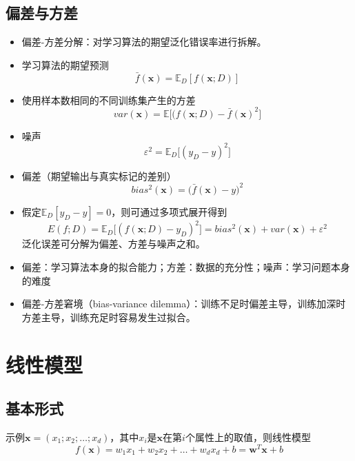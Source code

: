 \documentclass{ctexart}
\begin{document}
				\subsection{偏差与方差}
					\begin{itemize}
						\item 偏差-方差分解：对学习算法的期望泛化错误率进行拆解。
						\item 学习算法的期望预测\[\bar{f}(\bm{x})=\mathbb{E}_D[f(\bm{x};D)]\]
						\item 使用样本数相同的不同训练集产生的方差\[var(\bm{x})=\mathbb{E}\big[(f(\bm{x};D)-\bar{f}(\bm{x})^2\big]\]
						\item 噪声\[\varepsilon^2=\mathbb{E}_D\big[(y_D-y)^2\big]\]
						\item 偏差（期望输出与真实标记的差别）\[bias^2(\bm{x})=\big(\bar{f}(\bm{x})-y\big)^2\]
						\item 假定$\mathbb{E}_D[y_D-y]=0$，则可通过多项式展开得到\[E(f;D)=\mathbb{E}_D\big[(f(\bm{x};D)-y_D)^2\big]=bias^2(\bm{x})+var(\bm{x})+\varepsilon^2\]泛化误差可分解为偏差、方差与噪声之和。
						\item 偏差：学习算法本身的拟合能力；方差：数据的充分性；噪声：学习问题本身的难度
						\item 偏差-方差窘境（bias-variance dilemma）：训练不足时偏差主导，训练加深时方差主导，训练充足时容易发生过拟合。
					\end{itemize}
			\section{线性模型}
				\subsection{基本形式}
				
					示例$\bm{x}=(x_1;x_2;\dots;x_d)$，其中$x_i$是$\bm{x}$在第$i$个属性上的取值，则线性模型\[f(\bm{x})=w_1x_1+w_2x_2+\dots+w_dx_d+b=\bm{w}^T\bm{x}+b\]
\end{document}
